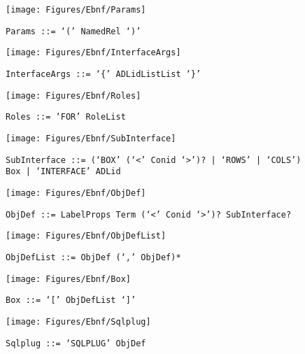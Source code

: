  \begin{figure}[H]
  \centering
  \texttt{[image: Figures/Ebnf/Params]}
  \caption*{\texttt{Params \small::=  `(' NamedRel `)'}}
  \label{fig:ebnf-Params}
 \end{figure}

 \begin{figure}[H]
  \centering
  \texttt{[image: Figures/Ebnf/InterfaceArgs]}
  \caption*{\texttt{InterfaceArgs \small::=  `\{' ADLidListList `\}'}}
  \label{fig:ebnf-InterfaceArgs}
 \end{figure}

 \begin{figure}[H]
  \centering
  \texttt{[image: Figures/Ebnf/Roles]}
  \caption*{\texttt{Roles \small::=  `FOR' RoleList}}
  \label{fig:ebnf-Roles}
 \end{figure}

 \begin{figure}[H]
  \centering
  \texttt{[image: Figures/Ebnf/SubInterface]}
  \caption*{\texttt{SubInterface \small::=  (`BOX' (`<' Conid `>')? | `ROWS' | `COLS') Box | `INTERFACE' ADLid}}
  \label{fig:ebnf-SubInterface}
 \end{figure}

 \begin{figure}[H]
  \centering
  \texttt{[image: Figures/Ebnf/ObjDef]}
  \caption*{\texttt{ObjDef \small::=  LabelProps Term (`<' Conid `>')? SubInterface?}}
  \label{fig:ebnf-ObjDef}
 \end{figure}

 \begin{figure}[H]
  \centering
  \texttt{[image: Figures/Ebnf/ObjDefList]}
  \caption*{\texttt{ObjDefList \small::=  ObjDef (`,' ObjDef)*}}
  \label{fig:ebnf-ObjDefList}
 \end{figure}

 \begin{figure}[H]
  \centering
  \texttt{[image: Figures/Ebnf/Box]}
  \caption*{\texttt{Box \small::=  `[' ObjDefList `]'}}
  \label{fig:ebnf-Box}
 \end{figure}

 \begin{figure}[H]
  \centering
  \texttt{[image: Figures/Ebnf/Sqlplug]}
  \caption*{\texttt{Sqlplug \small::=  `SQLPLUG' ObjDef}}
  \label{fig:ebnf-Sqlplug}
 \end{figure}

